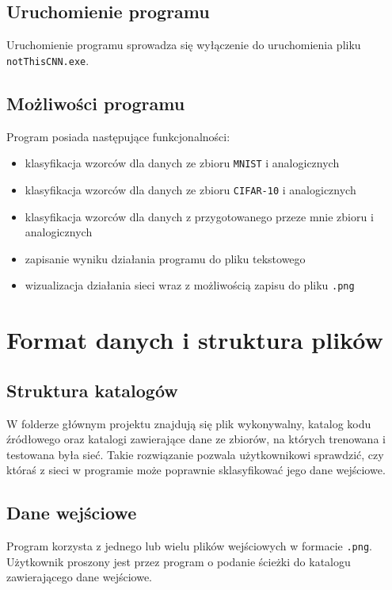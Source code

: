\documentclass[a4paper,12pt]{article}
\begin{document}
\subsection{Uruchomienie programu}

Uruchomienie programu sprowadza się wyłączenie do uruchomienia pliku \texttt{notThisCNN.exe}.

\subsection{Możliwości programu}

Program posiada następujące funkcjonalności:
\begin{itemize}
\item klasyfikacja wzorców dla danych ze zbioru \texttt{MNIST} i analogicznych
\item klasyfikacja wzorców dla danych ze zbioru \texttt{CIFAR-10} i analogicznych
\item klasyfikacja wzorców dla danych z przygotowanego przeze mnie zbioru i analogicznych
\item zapisanie wyniku działania programu do pliku tekstowego
\item wizualizacja działania sieci wraz z możliwością zapisu do pliku \texttt{.png}
\end{itemize}

\section{Format danych i struktura plików}

\subsection{Struktura katalogów}

W folderze głównym projektu znajdują się plik wykonywalny, katalog kodu źródłowego oraz katalogi zawierające dane ze zbiorów, na których trenowana i testowana była sieć. Takie rozwiązanie pozwala użytkownikowi sprawdzić, czy któraś z sieci w programie może poprawnie sklasyfikować jego dane wejściowe.

\subsection{Dane wejściowe}

Program korzysta z jednego lub wielu plików wejściowych w formacie \texttt{.png}. Użytkownik proszony jest przez program o podanie ścieżki do katalogu zawierającego dane wejściowe. \\
\end{document}
